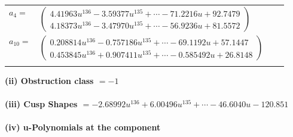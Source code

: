 \documentclass[1p]{elsarticle_modified}
\theoremstyle{definition}
\begin{document}
\begin{tabular}{m{7pt} m{180pt} m{7pt} m{180pt} }
\flushright $a_{4}=$&$\begin{pmatrix}4.41963 u^{136}-3.59377 u^{135}+\cdots-71.2216 u+92.7479\\4.18373 u^{136}-3.47970 u^{135}+\cdots-56.9236 u+81.5572\end{pmatrix}$ \\
\flushright $a_{10}=$&$\begin{pmatrix}0.208814 u^{136}-0.757186 u^{135}+\cdots-69.1192 u+57.1447\\0.453845 u^{136}+0.907411 u^{135}+\cdots-0.585492 u+26.8148\end{pmatrix}$\\&\end{tabular}
\flushleft \textbf{(ii) Obstruction class $= -1$}\\~\\
\flushleft \textbf{(iii) Cusp Shapes $= -2.68992 u^{136}+6.00496 u^{135}+\cdots-46.6040 u-120.851$}\\~\\
\newpage\renewcommand{\arraystretch}{1}
\flushleft \textbf{(iv) u-Polynomials at the component}\newline \\
\end{document}
